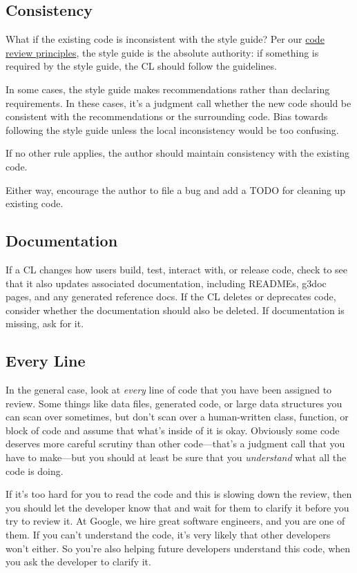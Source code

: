 \documentclass[
]{article}
\begin{document}
\subsection{Consistency}\label{consistency}

What if the existing code is inconsistent with the style guide? Per our
\href{standard.md\#principles}{code review principles}, the style guide
is the absolute authority: if something is required by the style guide,
the CL should follow the guidelines.

In some cases, the style guide makes recommendations rather than
declaring requirements. In these cases, it's a judgment call whether the
new code should be consistent with the recommendations or the
surrounding code. Bias towards following the style guide unless the
local inconsistency would be too confusing.

If no other rule applies, the author should maintain consistency with
the existing code.

Either way, encourage the author to file a bug and add a TODO for
cleaning up existing code.

\subsection{Documentation}\label{documentation}

If a CL changes how users build, test, interact with, or release code,
check to see that it also updates associated documentation, including
READMEs, g3doc pages, and any generated reference docs. If the CL
deletes or deprecates code, consider whether the documentation should
also be deleted. If documentation is missing, ask for it.

\subsection{Every Line}\label{every-line}

In the general case, look at \emph{every} line of code that you have
been assigned to review. Some things like data files, generated code, or
large data structures you can scan over sometimes, but don't scan over a
human-written class, function, or block of code and assume that what's
inside of it is okay. Obviously some code deserves more careful scrutiny
than other code---that's a judgment call that you have to make---but you
should at least be sure that you \emph{understand} what all the code is
doing.

If it's too hard for you to read the code and this is slowing down the
review, then you should let the developer know that and wait for them to
clarify it before you try to review it. At Google, we hire great
software engineers, and you are one of them. If you can't understand the
code, it's very likely that other developers won't either. So you're
also helping future developers understand this code, when you ask the
developer to clarify it.
\end{document}
